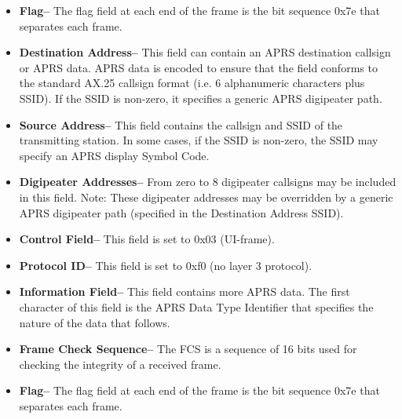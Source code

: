 \begin{itemize}


\item \textbf{Flag--} The flag field at each end of the frame is the bit sequence 0x7e
that separates each frame.

\item \textbf{Destination Address--} This field can contain an APRS destination
callsign or APRS data. APRS data is encoded to ensure that the field
conforms to the standard AX.25 callsign format (i.e. 6 alphanumeric
characters plus SSID). If the SSID is non-zero, it specifies a generic
APRS digipeater path.

\item \textbf{Source Address--} This field contains the callsign and SSID of the
transmitting station. In some cases, if the SSID is non-zero, the SSID
may specify an APRS display Symbol Code.

\item \textbf{Digipeater Addresses--} From zero to 8 digipeater callsigns may be
included in this field. Note: These digipeater addresses may be
overridden by a generic APRS digipeater path (specified in the
Destination Address SSID).

\item \textbf{Control Field--} This field is set to 0x03 (UI-frame).

\item \textbf{Protocol ID--} This field is set to 0xf0 (no layer 3 protocol).

\item \textbf{Information Field--} This field contains more APRS data. The first
character of this field is the APRS Data Type Identifier that specifies the
nature of the data that follows.

\item \textbf{Frame Check Sequence--} The FCS is a sequence of 16 bits used for
  checking the integrity of a received frame.

\item \textbf{Flag--} The flag field at each end of the frame is the
  bit sequence 0x7e that separates each frame.
    

\end{itemize}

